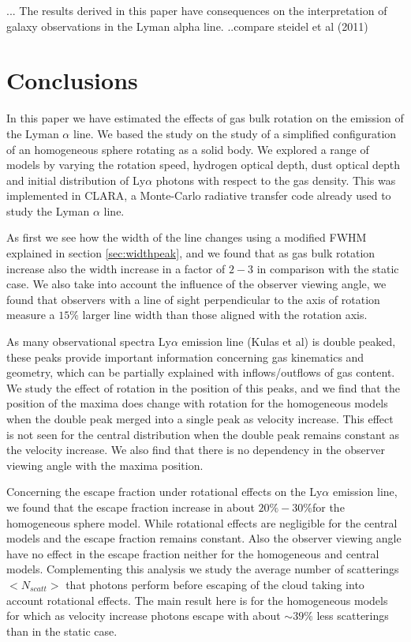 \documentclass[usenatbib]{mn2e}
\begin{document}
... The results derived in this paper have consequences on the
interpretation of galaxy observations in the Lyman alpha line.
..compare steidel et al (2011)



\section{Conclusions}
In this paper we have estimated the effects of gas bulk rotation on
the emission  of the Lyman $\alpha$ line. We based the study on the
study of a simplified configuration of an homogeneous sphere rotating
as a solid body. We explored  a range of models by varying the
rotation speed, hydrogen optical depth, dust optical depth and initial
distribution of Ly$\alpha$ photons with respect to the gas
density. This was implemented in CLARA, a Monte-Carlo
radiative transfer code already used to study the Lyman $\alpha$
line. 

As first we see how the width of the line changes using a modified FWHM
explained in section \ref{sec:widthpeak}, and we found that as gas bulk 
rotation increase also the width increase in a factor of $2-3$ in comparison 
with the static case. We also take into account the influence of the observer 
viewing angle, we found that observers with a line of sight perpendicular  
to the axis of rotation measure a $15\%$ larger line width than those 
aligned with the rotation axis.

As many observational spectra Ly$\alpha$ emission line (Kulas et al)
is double  peaked, these peaks provide important information
concerning gas kinematics and geometry,  which can be partially
explained with inflows/outflows of gas content.  We study the effect
of rotation in the position of this peaks, and we find  that the
position of the maxima does change with rotation for the homogeneous
models when the double peak merged into a single peak as velocity
increase. This effect is not seen for the central distribution when
the double peak  remains constant as the velocity increase. We also
find that there is no dependency in the observer viewing angle with
the maxima position. 

Concerning the escape fraction under rotational effects on the
Ly$\alpha$ emission line, we found that the escape fraction increase
in about $20\%-30\%$for the homogeneous sphere model. While rotational
effects are negligible for the central models and the escape fraction
remains constant. Also the observer viewing angle have no effect in
the escape fraction neither for the homogeneous and central
models. Complementing this analysis we study the average number of
scatterings $<N_{scatt}>$ that photons perform before escaping of the
cloud taking into account rotational effects. The main result here is
for the homogeneous models for which as velocity increase photons
escape with about $\sim 39\%$  less scatterings than in the static
case. 
\end{document}
